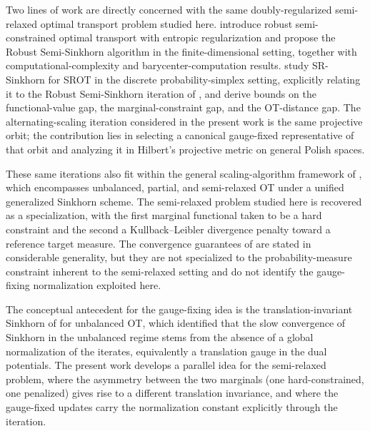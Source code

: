 \documentclass{article}
\begin{document}
Two lines of work are directly concerned with the same doubly-regularized semi-relaxed optimal transport problem studied here. \cite{le2021robust} introduce robust semi-constrained optimal transport with entropic regularization and propose the Robust Semi-Sinkhorn algorithm in the finite-dimensional setting, together with computational-complexity and barycenter-computation results. \cite{fukunaga2022convergence} study SR-Sinkhorn for SROT in the discrete probability-simplex setting, explicitly relating it to the Robust Semi-Sinkhorn iteration of \cite{le2021robust}, and derive bounds on the functional-value gap, the marginal-constraint gap, and the OT-distance gap. The alternating-scaling iteration considered in the present work is the same projective orbit; the contribution lies in selecting a canonical gauge-fixed representative of that orbit and analyzing it in Hilbert's projective metric on general Polish spaces.

These same iterations also fit within the general scaling-algorithm framework of \cite{chizat2018scaling}, which encompasses unbalanced, partial, and semi-relaxed OT under a unified generalized Sinkhorn scheme. The semi-relaxed problem studied here is recovered as a specialization, with the first marginal functional taken to be a hard constraint and the second a Kullback--Leibler divergence penalty toward a reference target measure. The convergence guarantees of \cite{chizat2018scaling} are stated in considerable generality, but they are not specialized to the probability-measure constraint inherent to the semi-relaxed setting and do not identify the gauge-fixing normalization exploited here.

The conceptual antecedent for the gauge-fixing idea is the translation-invariant Sinkhorn of \cite{sejourne2022faster} for unbalanced OT, which identified that the slow convergence of Sinkhorn in the unbalanced regime stems from the absence of a global normalization of the iterates, equivalently a translation gauge in the dual potentials. The present work develops a parallel idea for the semi-relaxed problem, where the asymmetry between the two marginals (one hard-constrained, one penalized) gives rise to a different translation invariance, and where the gauge-fixed updates carry the normalization constant explicitly through the iteration.
\end{document}
